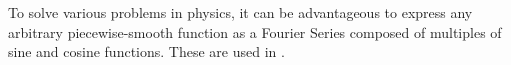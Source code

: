 \documentclass[openany]{memoir}
\begin{document}
To solve various problems in physics, it can be advantageous
to express any arbitrary piecewise-smooth function as a Fourier Series
composed of multiples of sine  and cosine  functions.  These are used in \cite{acheson1990elementary}.

\printindex



\end{document}

